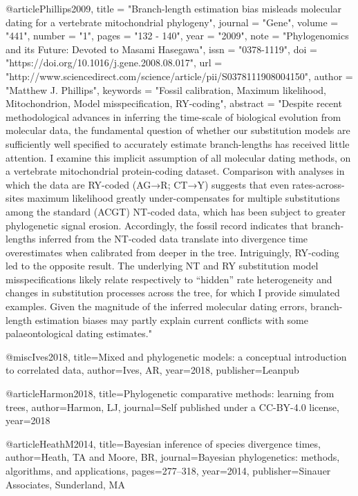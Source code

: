 
@article{Phillips2009,
title = "Branch-length estimation bias misleads molecular dating for a vertebrate mitochondrial phylogeny",
journal = "Gene",
volume = "441",
number = "1",
pages = "132 - 140",
year = "2009",
note = "Phylogenomics and its Future: Devoted to Masami Hasegawa",
issn = "0378-1119",
doi = "https://doi.org/10.1016/j.gene.2008.08.017",
url = "http://www.sciencedirect.com/science/article/pii/S0378111908004150",
author = "Matthew J. Phillips",
keywords = "Fossil calibration, Maximum likelihood, Mitochondrion, Model misspecification, RY-coding",
abstract = "Despite recent methodological advances in inferring the time-scale of biological evolution from molecular data, the fundamental question of whether our substitution models are sufficiently well specified to accurately estimate branch-lengths has received little attention. I examine this implicit assumption of all molecular dating methods, on a vertebrate mitochondrial protein-coding dataset. Comparison with analyses in which the data are RY-coded (AG→R; CT→Y) suggests that even rates-across-sites maximum likelihood greatly under-compensates for multiple substitutions among the standard (ACGT) NT-coded data, which has been subject to greater phylogenetic signal erosion. Accordingly, the fossil record indicates that branch-lengths inferred from the NT-coded data translate into divergence time overestimates when calibrated from deeper in the tree. Intriguingly, RY-coding led to the opposite result. The underlying NT and RY substitution model misspecifications likely relate respectively to “hidden” rate heterogeneity and changes in substitution processes across the tree, for which I provide simulated examples. Given the magnitude of the inferred molecular dating errors, branch-length estimation biases may partly explain current conflicts with some palaeontological dating estimates."
}


@misc{Ives2018,
  title={Mixed and phylogenetic models: a conceptual introduction to correlated data},
  author={Ives, AR},
  year={2018},
  publisher={Leanpub}
}

@article{Harmon2018,
  title={Phylogenetic comparative methods: learning from trees},
  author={Harmon, LJ},
  journal={Self published under a CC-BY-4.0 license},
  year={2018}
}

@article{HeathM2014,
  title={Bayesian inference of species divergence times},
  author={Heath, TA and Moore, BR},
  journal={Bayesian phylogenetics: methods, algorithms, and applications},
  pages={277--318},
  year={2014},
  publisher={Sinauer Associates, Sunderland, MA}
}